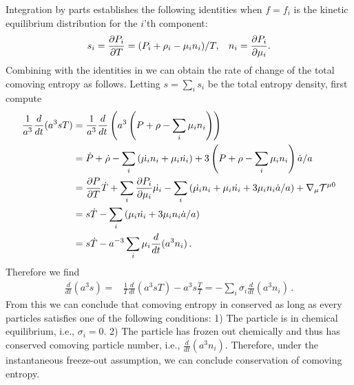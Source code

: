 Integration by parts establishes the following identities when $f=f_i$ is the kinetic equilibrium distribution  for the $i$'th component:
\begin{equation}\label{identities}
s_i=\frac{\partial P_i}{\partial T}=(P_i+\rho_i-\mu_i n_i)/T, \hspace{3mm} n_i=\frac{\partial P_i}{\partial \mu_i}.
\end{equation}
Combining  with the identities in  we can obtain the rate of change of the total comoving entropy as follows.  Letting $s=\sum_i s_i$ be the total entropy density, first compute
\begin{align}\frac{1}{a^3}\frac{d}{dt}(a^3sT)&=\frac{1}{a^{3}}\frac{d}{dt}\left(a^3\left(P+\rho-\sum_i \mu_i n_i\right)\right)\\
&=\dot{P}+\dot{\rho}-\sum_i \left(\dot{\mu_i}n_i+\mu_i\dot{n_i}\right)+3\left(P+\rho-\sum_i \mu_i n_i\right)\dot{a}/a\notag\\
&=\frac{\partial P}{\partial T} \dot{T}+\sum_i\frac{\partial P_i}{\partial \mu_i} \dot{\mu_i}-\sum_i \left(\dot{\mu_i}n_i+\mu_i\dot{n_i}+3\mu_i n_i \dot{a}/a\right)+\nabla_\mu \mathcal{T}^{\mu 0}\notag\\
&=s\dot{T}-\sum_i \left(\mu_i\dot{n_i}+3\mu_i n_i \dot{a}/a\right)\notag\\
&=s\dot{T}- a^{-3}\sum_i\mu_i\frac{d}{dt}(a^3n_i)\,.\notag
\end{align}
Therefore we find
\begin{align}\label{S_n_eq}
\frac{d}{dt}(a^3s)=&\frac{1}{T}\frac{d}{dt}(a^3sT)-a^3s\frac{\dot T}{T}=-\sum_i\sigma_i\frac{d}{dt}(a^3n_i)\,.
\end{align}
From this we can conclude that comoving entropy in conserved as long as every particles satisfies one of the following  conditions: 1) The particle is  in chemical equilibrium, i.e., $\sigma_i= 0$. 2) The particle has frozen out chemically and thus has conserved comoving particle number, i.e., $\frac{d}{dt}(a^3n_i)$.  Therefore, under the instantaneous freeze-out assumption, we can conclude  conservation of comoving entropy. 


